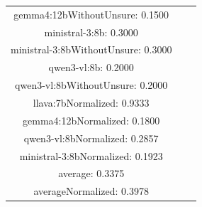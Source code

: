 \documentclass[a4paper]{article}
\begin{document}
\begin{tabular}{ccc}
gemma4:12bWithoutUnsure: 0.1500 \\ ministral-3:8b: 0.3000 \\ ministral-3:8bWithoutUnsure: 0.3000 \\ qwen3-vl:8b: 0.2000 \\ qwen3-vl:8bWithoutUnsure: 0.2000 \\ llava:7bNormalized: 0.9333 \\ gemma4:12bNormalized: 0.1800 \\ qwen3-vl:8bNormalized: 0.2857 \\ ministral-3:8bNormalized: 0.1923 \\ average: 0.3375 \\ averageNormalized: 0.3978 \end{minipage}\\
\end{tabular}

\vspace{5mm}
\end{document}
